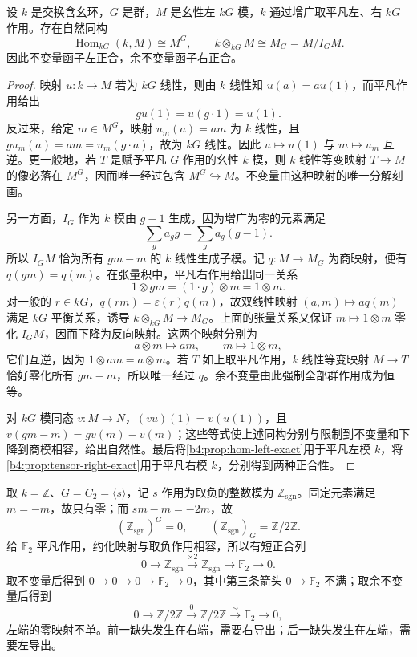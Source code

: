 \begin{proposition}\label{b4:prop:group-invariant-functors}
	设 \(k\) 是交换含幺环，\(G\) 是群，\(M\) 是幺性左 \(kG\) 模，\(k\) 通过增广取平凡左、右 \(kG\) 作用。存在自然同构
	\[
		\operatorname{Hom}_{kG}(k,M)\cong M^G, \qquad k\otimes_{kG}M\cong M_G=M/I_GM.
	\]
	因此不变量函子左正合，余不变量函子右正合。
\end{proposition}
\begin{proof}
	映射 \(u:k\to M\) 若为 \(kG\) 线性，则由 \(k\) 线性知 \(u(a)=a u(1)\)，而平凡作用给出
	\[
		g u(1)=u(g\cdot1)=u(1).
	\]
	反过来，给定 \(m\in M^G\)，映射 \(u_m(a)=am\) 为 \(k\) 线性，且 \(g u_m(a)=am=u_m(g\cdot a)\)，故为 \(kG\) 线性。因此 \(u\mapsto u(1)\) 与 \(m\mapsto u_m\) 互逆。更一般地，若 \(T\) 是赋予平凡 \(G\) 作用的幺性 \(k\) 模，则 \(k\) 线性等变映射 \(T\to M\) 的像必落在 \(M^G\)，因而唯一经过包含 \(M^G\hookrightarrow M\)。不变量由这种映射的唯一分解刻画。

	另一方面，\(I_G\) 作为 \(k\) 模由 \(g-1\) 生成，因为增广为零的元素满足
	\[
		\sum_g a_g g=\sum_g a_g(g-1).
	\]
	所以 \(I_GM\) 恰为所有 \(gm-m\) 的 \(k\) 线性生成子模。记 \(q:M\to M_G\) 为商映射，便有 \(q(gm)=q(m)\)。在张量积中，平凡右作用给出同一关系
	\[
		1\otimes gm=(1\cdot g)\otimes m=1\otimes m.
	\]
	对一般的 \(r\in kG\)，\(q(rm)=\varepsilon(r)q(m)\)，故双线性映射 \((a,m)\mapsto a q(m)\) 满足 \(kG\) 平衡关系，诱导 \(k\otimes_{kG}M\to M_G\)。上面的张量关系又保证 \(m\mapsto1\otimes m\) 零化 \(I_GM\)，因而下降为反向映射。这两个映射分别为
	\[
		a\otimes m\longmapsto a\bar m, \qquad \bar m\longmapsto1\otimes m,
	\]
	它们互逆，因为 \(1\otimes am=a\otimes m\)。若 \(T\) 如上取平凡作用，\(k\) 线性等变映射 \(M\to T\) 恰好零化所有 \(gm-m\)，所以唯一经过 \(q\)。余不变量由此强制全部群作用成为恒等。

	对 \(kG\) 模同态 \(v:M\to N\)，\((vu)(1)=v(u(1))\)，且 \(v(gm-m)=gv(m)-v(m)\)；这些等式使上述同构分别与限制到不变量和下降到商模相容，给出自然性。最后将\cref{b4:prop:hom-left-exact}用于平凡左模 \(k\)，将\cref{b4:prop:tensor-right-exact}用于平凡右模 \(k\)，分别得到两种正合性。
\end{proof}

取 \(k=\mathbb Z\)、\(G=C_2=\langle s\rangle\)，记 \(s\) 作用为取负的整数模为 \(\mathbb Z_{\mathrm{sgn}}\)。固定元素满足 \(m=-m\)，故只有零；而 \(sm-m=-2m\)，故
\[
	(\mathbb Z_{\mathrm{sgn}})^G=0, \qquad (\mathbb Z_{\mathrm{sgn}})_G=\mathbb Z/2\mathbb Z.
\]
给 \(\mathbb F_2\) 平凡作用，约化映射与取负作用相容，所以有短正合列
\[
	0\longrightarrow\mathbb Z_{\mathrm{sgn}}\xrightarrow{\times2} \mathbb Z_{\mathrm{sgn}}\longrightarrow\mathbb F_2\longrightarrow0.
\]
取不变量后得到 \(0\to0\to0\to\mathbb F_2\to0\)，其中第三条箭头 \(0\to\mathbb F_2\) 不满；取余不变量后得到
\[
	0\longrightarrow\mathbb Z/2\mathbb Z\xrightarrow{0}\mathbb Z/2\mathbb Z \xrightarrow{\sim}\mathbb F_2\longrightarrow0,
\]
左端的零映射不单。前一缺失发生在右端，需要右导出；后一缺失发生在左端，需要左导出。

